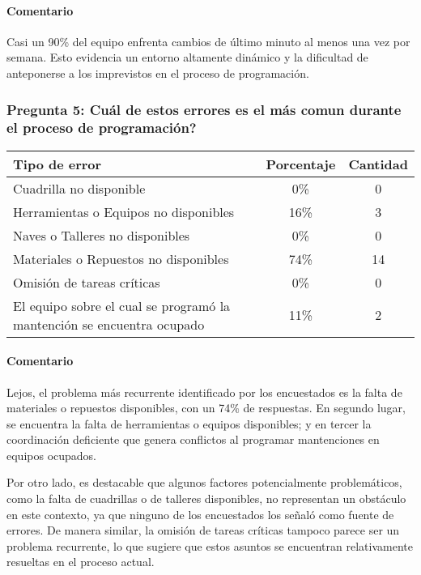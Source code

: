 \documentclass{article}
\begin{document}
\paragraph{Comentario} Casi un 90\% del equipo enfrenta cambios de último minuto al menos una vez por semana. Esto evidencia un entorno altamente dinámico y la dificultad de anteponerse a los imprevistos en el proceso de programación.


\vspace{1.5em}
\subsubsection*{Pregunta 5: Cuál de estos errores es el más comun durante el proceso de programación?}

\begin{table}[H]
    \centering
    \begin{tabular}{p{7cm}cc}
        \toprule
        \textbf{Tipo de error} & \textbf{Porcentaje} & \textbf{Cantidad} \\
        \midrule
        Cuadrilla no disponible & 0\% & 0 \\
        Herramientas o Equipos no disponibles & 16\% & 3 \\
        Naves o Talleres no disponibles & 0\% & 0 \\
        Materiales o Repuestos no disponibles & 74\% & 14 \\
        Omisión de tareas críticas & 0\% & 0 \\
        El equipo sobre el cual se programó la mantención se encuentra ocupado & 11\% & 2 \\
        \bottomrule
    \end{tabular}
    \label{tab:errores_comunes}
\end{table}

\paragraph{Comentario} Lejos, el problema más recurrente identificado por los encuestados es la falta de materiales o repuestos disponibles, con un 74\% de respuestas. En segundo lugar, se encuentra la falta de herramientas o equipos disponibles; y en tercer la coordinación deficiente que genera conflictos al programar mantenciones en equipos ocupados.

Por otro lado, es destacable que algunos factores potencialmente problemáticos, como la falta de cuadrillas o de talleres disponibles, no representan un obstáculo en este contexto, ya que ninguno de los encuestados los señaló como fuente de errores. De manera similar, la omisión de tareas críticas tampoco parece ser un problema recurrente, lo que sugiere que estos asuntos se encuentran relativamente resueltas en el proceso actual.
\end{document}
